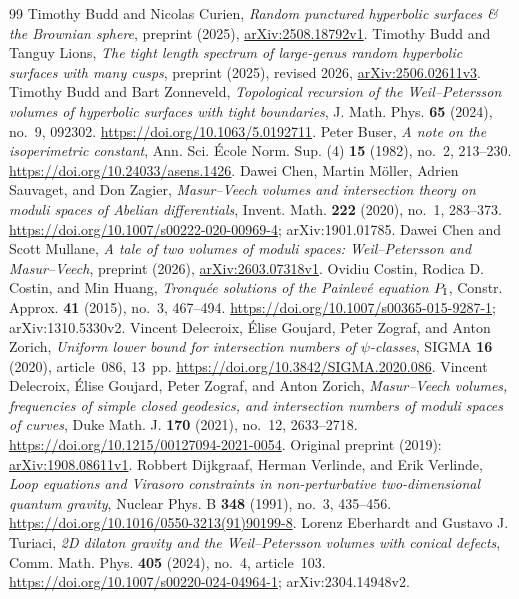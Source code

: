 \begin{thebibliography}{99}
 Timothy Budd and Nicolas Curien, \emph{Random punctured hyperbolic surfaces \& the Brownian sphere}, preprint (2025), \href{https://arxiv.org/abs/2508.18792v1}{arXiv:2508.18792v1}.
 Timothy Budd and Tanguy Lions, \emph{The tight length spectrum of large-genus random hyperbolic surfaces with many cusps}, preprint (2025), revised 2026, \href{https://arxiv.org/abs/2506.02611v3}{arXiv:2506.02611v3}.
 Timothy Budd and Bart Zonneveld, \emph{Topological recursion of the Weil--Petersson volumes of hyperbolic surfaces with tight boundaries}, J. Math. Phys. \textbf{65} (2024), no.~9, 092302. \url{https://doi.org/10.1063/5.0192711}.
 Peter Buser, \emph{A note on the isoperimetric constant}, Ann. Sci. \'Ecole Norm. Sup. (4) \textbf{15} (1982), no.~2, 213--230. \url{https://doi.org/10.24033/asens.1426}.
 Dawei Chen, Martin M\"oller, Adrien Sauvaget, and Don Zagier, \emph{Masur--Veech volumes and intersection theory on moduli spaces of Abelian differentials}, Invent. Math. \textbf{222} (2020), no.~1, 283--373. \url{https://doi.org/10.1007/s00222-020-00969-4}; arXiv:1901.01785.
 Dawei Chen and Scott Mullane, \emph{A tale of two volumes of moduli spaces: Weil--Petersson and Masur--Veech}, preprint (2026), \href{https://arxiv.org/abs/2603.07318v1}{arXiv:2603.07318v1}.
 Ovidiu Costin, Rodica D. Costin, and Min Huang, \emph{Tronqu\'ee solutions of the Painlev\'e equation $P_{\rm I}$}, Constr. Approx. \textbf{41} (2015), no.~3, 467--494. \url{https://doi.org/10.1007/s00365-015-9287-1}; arXiv:1310.5330v2.
 Vincent Delecroix, \'Elise Goujard, Peter Zograf, and Anton Zorich, \emph{Uniform lower bound for intersection numbers of $\psi$-classes}, SIGMA \textbf{16} (2020), article~086, 13~pp. \url{https://doi.org/10.3842/SIGMA.2020.086}.
 Vincent Delecroix, \'Elise Goujard, Peter Zograf, and Anton Zorich, \emph{Masur--Veech volumes, frequencies of simple closed geodesics, and intersection numbers of moduli spaces of curves}, Duke Math. J. \textbf{170} (2021), no.~12, 2633--2718. \url{https://doi.org/10.1215/00127094-2021-0054}. Original preprint (2019): \href{https://arxiv.org/abs/1908.08611v1}{arXiv:1908.08611v1}.
 Robbert Dijkgraaf, Herman Verlinde, and Erik Verlinde, \emph{Loop equations and Virasoro constraints in non-perturbative two-dimensional quantum gravity}, Nuclear Phys. B \textbf{348} (1991), no.~3, 435--456. \url{https://doi.org/10.1016/0550-3213(91)90199-8}.
 Lorenz Eberhardt and Gustavo J. Turiaci, \emph{2D dilaton gravity and the Weil--Petersson volumes with conical defects}, Comm. Math. Phys. \textbf{405} (2024), no.~4, article~103. \url{https://doi.org/10.1007/s00220-024-04964-1}; arXiv:2304.14948v2.

\end{thebibliography}
